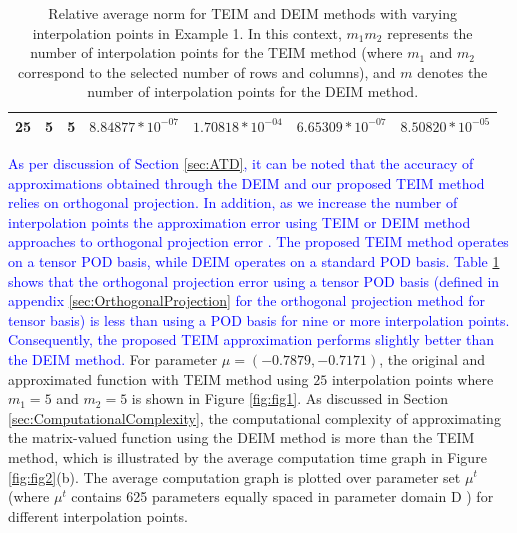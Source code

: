 \documentclass{article}
\begin{document}
\begin{table}
{\begin{tabular}{|c|c|c|c|c|c|c|}
25         & 5           & 5           & $8.84877*10^{-07}$                                                                       & $1.70818*10^{-04}$                                                                      & $6.65309*10^{-07} $                                                                                                     & $8.50820*10^{-05}$                                                                                                   \\ \hline
\end{tabular}%
}
\caption{ Relative average norm for TEIM and DEIM methods with varying interpolation points in Example 1. In this context, $m_1m_2$ represents the number of interpolation points for the TEIM method (where $m_1$ and $m_2$ correspond to the selected number of rows and columns), and $m$ denotes the number of interpolation points for the DEIM method.}
\label{tab:table4}
\end{table}


\textcolor{blue}{As per discussion of Section \ref{sec:ATD}, it can be noted that the accuracy of approximations obtained through the DEIM and our proposed TEIM method relies on orthogonal projection. In addition, as we increase the number of interpolation points the approximation error using TEIM or DEIM method approaches to orthogonal projection error \cite{SecondPaper,DEIM}. The proposed TEIM method operates on a tensor POD basis, while DEIM operates on a standard POD basis. Table \ref{tab:table4} shows that the orthogonal projection error using a tensor POD basis (defined in appendix \ref{sec:OrthogonalProjection} for the orthogonal projection method for tensor basis) is less than using a POD basis for nine or more interpolation points. Consequently, the proposed TEIM approximation performs slightly better than the DEIM method.} For parameter $\mu=(-0.7879,-0.7171)$, the original and approximated function with TEIM method using $25$ interpolation points where  $m_1=5$ and $m_2=5$ is shown in Figure \ref{fig:fig1}. As discussed in Section \ref{sec:ComputationalComplexity}, the computational complexity of approximating the matrix-valued function using the DEIM method is more than the TEIM method, which is illustrated by the average computation time graph in Figure \ref{fig:fig2}(b). The average computation graph is plotted over parameter set $\mu^t$ (where $\mu^t$ contains 625 parameters equally spaced in parameter domain D ) for different interpolation points.

 
\end{document}
